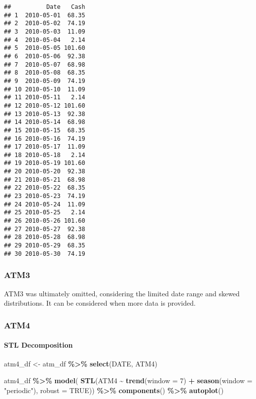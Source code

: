 \documentclass[
]{article}
\newenvironment{Shaded}{\begin{snugshade}}{\end{snugshade}}
\newcommand{\AttributeTok}[1]{\textcolor[rgb]{0.13,0.29,0.53}{#1}}
\newcommand{\ConstantTok}[1]{\textcolor[rgb]{0.56,0.35,0.01}{#1}}
\newcommand{\DecValTok}[1]{\textcolor[rgb]{0.00,0.00,0.81}{#1}}
\newcommand{\FunctionTok}[1]{\textcolor[rgb]{0.13,0.29,0.53}{\textbf{#1}}}
\newcommand{\NormalTok}[1]{#1}
\newcommand{\OtherTok}[1]{\textcolor[rgb]{0.56,0.35,0.01}{#1}}
\newcommand{\SpecialCharTok}[1]{\textcolor[rgb]{0.81,0.36,0.00}{\textbf{#1}}}
\newcommand{\StringTok}[1]{\textcolor[rgb]{0.31,0.60,0.02}{#1}}
\begin{document}
\begin{verbatim}
##          Date   Cash
## 1  2010-05-01  68.35
## 2  2010-05-02  74.19
## 3  2010-05-03  11.09
## 4  2010-05-04   2.14
## 5  2010-05-05 101.60
## 6  2010-05-06  92.38
## 7  2010-05-07  68.98
## 8  2010-05-08  68.35
## 9  2010-05-09  74.19
## 10 2010-05-10  11.09
## 11 2010-05-11   2.14
## 12 2010-05-12 101.60
## 13 2010-05-13  92.38
## 14 2010-05-14  68.98
## 15 2010-05-15  68.35
## 16 2010-05-16  74.19
## 17 2010-05-17  11.09
## 18 2010-05-18   2.14
## 19 2010-05-19 101.60
## 20 2010-05-20  92.38
## 21 2010-05-21  68.98
## 22 2010-05-22  68.35
## 23 2010-05-23  74.19
## 24 2010-05-24  11.09
## 25 2010-05-25   2.14
## 26 2010-05-26 101.60
## 27 2010-05-27  92.38
## 28 2010-05-28  68.98
## 29 2010-05-29  68.35
## 30 2010-05-30  74.19
\end{verbatim}

\hypertarget{atm3}{%
\subsubsection{ATM3}\label{atm3}}

ATM3 was ultimately omitted, considering the limited date range and
skewed distributions. It can be considered when more data is provided.

\hypertarget{atm4}{%
\subsubsection{ATM4}\label{atm4}}

\hypertarget{stl-decomposition-2}{%
\paragraph{STL Decomposition}\label{stl-decomposition-2}}

\begin{Shaded}
\begin{Highlighting}[]
\NormalTok{atm4\_df }\OtherTok{\textless{}{-}}\NormalTok{ atm\_df }\SpecialCharTok{\%\textgreater{}\%} 
  \FunctionTok{select}\NormalTok{(DATE, ATM4)}

\NormalTok{atm4\_df }\SpecialCharTok{\%\textgreater{}\%}
  \FunctionTok{model}\NormalTok{(}
    \FunctionTok{STL}\NormalTok{(ATM4 }\SpecialCharTok{\textasciitilde{}} \FunctionTok{trend}\NormalTok{(}\AttributeTok{window =} \DecValTok{7}\NormalTok{) }\SpecialCharTok{+}
                   \FunctionTok{season}\NormalTok{(}\AttributeTok{window =} \StringTok{"periodic"}\NormalTok{),}
    \AttributeTok{robust =} \ConstantTok{TRUE}\NormalTok{)) }\SpecialCharTok{\%\textgreater{}\%}
  \FunctionTok{components}\NormalTok{() }\SpecialCharTok{\%\textgreater{}\%}
  \FunctionTok{autoplot}\NormalTok{()}
\end{Highlighting}
\end{Shaded}
\end{document}
